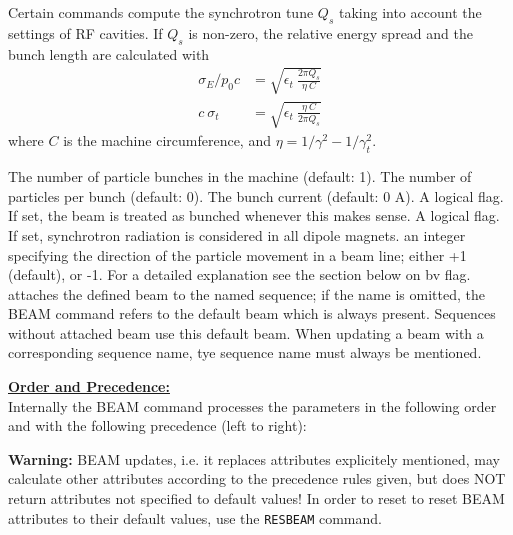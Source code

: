 Certain commands compute the synchrotron tune $Q_s$ taking into account
the settings of RF cavities. 
If $Q_s$ is non-zero, the relative energy spread and 
the bunch length are calculated with
\begin{align*}
\sigma_E / p_0 c  &=  \sqrt{\epsilon_t\ \frac{2 \pi Q_s}{\eta\ C}} \\
  c\ \sigma_t &= \sqrt{\epsilon_t\ \frac{\eta\ C}{2 \pi Q_s}}
\end{align*}
where $C$ is the machine circumference, and 
$\eta = 1/\gamma^2 - 1/\gamma_t^2$.  
\\

\begin{madlist}
   The number of particle bunches in the
  machine (default: 1).  
   \label{beam_npart} The number of particles per bunch (default: 0). 
   The bunch current (default: 0 A). 
   A logical flag. If set, the beam is
  treated as bunched whenever this makes sense.  
   \label{beam_radiate} A logical flag. If set, synchrotron
  radiation is considered in all dipole magnets.  
   an integer specifying the direction of the
  particle movement in a beam line; either +1 (default), or -1. For a
  detailed explanation see the section below on bv flag.  
   attaches the defined beam to the named sequence; if
  the name is omitted, the BEAM command refers to the default beam
  which is always present. Sequences without attached beam use this
  default beam. When updating a beam with a corresponding sequence name,
  tye sequence name must always be mentioned.    
\end{madlist} 

{\bf \underline{Order and Precedence:}}\\
Internally the BEAM command processes the parameters in the following
order and with the following precedence (left to right): 


{\bf Warning:} BEAM updates, i.e. it replaces attributes explicitely
mentioned, may calculate other attributes according to the precedence rules
given, but does NOT return attributes not specified to default values! 
In order to reset to reset BEAM attributes to their default values, use
the {\tt RESBEAM} command.


